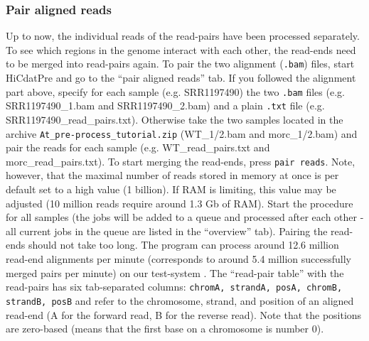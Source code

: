 \documentclass[a4paper,10pt]{article}
\begin{document}
\subsubsection{Pair aligned reads}\label{pairTab}
Up to now, the individual reads of the read-pairs  have been processed separately. To see which regions in the genome interact with each other, the read-ends need to be merged into read-pairs again. To pair the two alignment (\texttt{.bam}) files, start HiCdatPre and go to the ``pair aligned reads'' tab. If you followed the alignment part above, specify for each sample (e.g. SRR1197490) the two \texttt{.bam} files (e.g. SRR1197490\_1.bam and SRR1197490\_2.bam) and a plain \texttt{.txt} file (e.g. SRR1197490\_read\_pairs.txt). Otherwise take the two samples located in the archive \texttt{At\_pre-process\_tutorial.zip} (WT\_1/2.bam and morc\_1/2.bam) and pair the reads for each sample (e.g. WT\_read\_pairs.txt and morc\_read\_pairs.txt). To start merging the read-ends, press \texttt{pair reads}. Note, however, that the maximal number of reads stored in memory at once is per default set to a high value (1 billion). If RAM is limiting, this value may be adjusted (10 million reads require around 1.3 Gb of RAM). Start the procedure for all samples (the jobs will be added to a queue and processed after each other - all current jobs in the queue are listed in the ``overview'' tab). Pairing the read-ends should not take too long. The program can process around 12.6 million read-end alignments per minute (corresponds to around 5.4 million successfully merged pairs per minute) on our test-system \cite{TESTSYSTEM}.
\newline
\newline
The ``read-pair table'' with the read-pairs has six tab-separated columns: \texttt{chromA, strandA, posA, chromB, strandB, posB} and refer to the chromosome, strand, and position of an aligned read-end (A for the forward read, B for the reverse read). Note that the positions are zero-based (means that the first base on a chromosome is number 0). 
\end{document}
